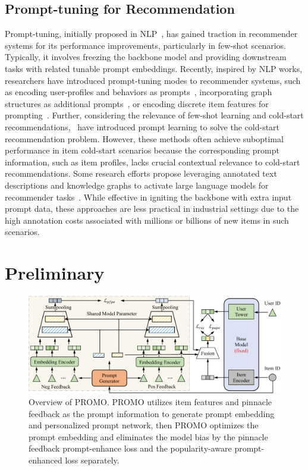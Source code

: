 \documentclass[sigconf]{acmart}
\newcommand{\sys}{\textsc{PROMO}\xspace}
\begin{document}
\subsection{Prompt-tuning for Recommendation}
Prompt-tuning, initially proposed in NLP~\cite{li2021prefix,chen2022inducer,ding2021openprompt}, has gained traction in recommender systems for its performance improvements, particularly in few-shot scenarios. 
Typically, it involves freezing the backbone model and providing downstream tasks with related tunable prompt embeddings. 
Recently, inspired by NLP works, researchers have introduced prompt-tuning modes to recommender systems, such as encoding user-profiles and behaviors as prompts~\cite{wu2024personalized}, incorporating graph structures as additional prompts~\cite{zhai2023knowledge}, or encoding discrete item features for prompting~\cite{li2023personalized}. 
Further, considering the relevance of few-shot learning and cold-start recommendations,~\cite{wu2023towards,wu2024personalized} have introduced prompt learning to solve the cold-start recommendation problem. 
However, these methods often achieve suboptimal performance in item cold-start scenarios because the corresponding prompt information, such as item profiles, lacks crucial contextual relevance to cold-start recommendations. 
Some research efforts propose leveraging annotated text descriptions and knowledge graphs to activate large language models for recommender tasks~\cite{geng2022recommendation,xu2024prompting,wang2022towards}. 
While effective in igniting the backbone with extra input prompt data, these approaches are less practical in industrial settings due to the high annotation costs associated with millions or billions of new items in such scenarios.

\section{Preliminary}
% 
\begin{figure}[t]
\centering
\includegraphics[width=1.0\linewidth]{figure/framework.pdf}
\caption{Overview of \sys. \sys utilizes item features and pinnacle feedback as the prompt information to generate prompt embedding and personalized prompt network, then \sys optimizes the prompt embedding and eliminates the model bias by the pinnacle feedback prompt-enhance loss and the popularity-aware prompt-enhanced loss separately. }
\label{pipeline}
\end{figure}
\end{document}
